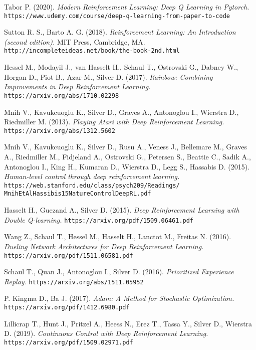 \begin{thebibliography}{99}

Tabor P. (2020).
\textit{Modern Reinforcement Learning: Deep Q Learning in Pytorch.} 
\texttt{https://www.udemy.com/course/deep-q-learning-from-paper-to-code}

Sutton R. S., Barto A. G. (2018).
\textit{Reinforcement Learning: An Introduction (second edition).}
MIT Press, Cambridge, MA.
\texttt{http://incompleteideas.net/book/the-book-2nd.html}

Hessel M., Modayil J., van Hasselt H., Schaul T., Ostrovski G., Dabney W., Horgan D., Piot B., Azar M., Silver D. (2017).
\textit{Rainbow: Combining Improvements in Deep Reinforcement Learning.}
\texttt{https://arxiv.org/abs/1710.02298}

Mnih V., Kavukcuoglu K., Silver D., Graves A., Antonoglou I., Wierstra D., Riedmiller M. (2013).
\textit{Playing Atari with Deep Reinforcement Learning.}
\texttt{https://arxiv.org/abs/1312.5602}

Mnih V., Kavukcuoglu K., Silver D., Rusu A., Veness J., Bellemare M., Graves A., Riedmiller M., Fidjeland A., Ostrovski G., Petersen S., Beattie C., Sadik A., Antonoglou I., King H., Kumaran D., Wierstra D., Legg S., Hassabis D. (2015).
\textit{Human-level control through deep reinforcement learning.}
\texttt{https://web.stanford.edu/class/psych209/Readings/ MnihEtAlHassibis15NatureControlDeepRL.pdf}

Hasselt H., Guezand A., Silver D. (2015).
\textit{Deep Reinforcement Learning with Double Q-learning.}
\texttt{https://arxiv.org/pdf/1509.06461.pdf}

Wang Z., Schaul T., Hessel M., Hasselt H., Lanctot M., Freitas N. (2016).
\textit{Dueling Network Architectures for Deep Reinforcement Learning.}
\texttt{https://arxiv.org/pdf/1511.06581.pdf}

Schaul T., Quan J., Antonoglou I., Silver D. (2016).
\textit{Prioritized Experience Replay.}
\texttt{https://arxiv.org/abs/1511.05952}

P. Kingma D., Ba J. (2017).
\textit{Adam: A Method for Stochastic Optimization.}
\texttt{https://arxiv.org/pdf/1412.6980.pdf}

Lillicrap T., Hunt J., Pritzel A., Heess N., Erez T., Tassa Y., Silver D., Wierstra D. (2019).
\textit{Continuous Control with Deep Reinforcement Learning.}
\texttt{https://arxiv.org/pdf/1509.02971.pdf}


\end{thebibliography}
